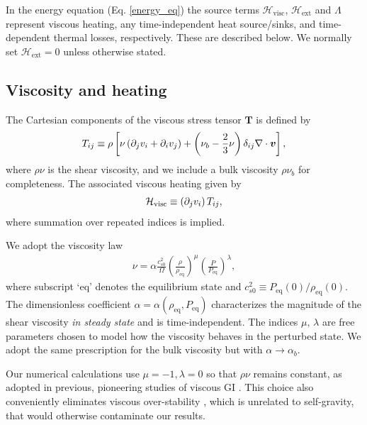 In the energy equation (Eq. \ref{energy_eq}) the source terms 
$\mathcal{H}_\mathrm{visc}$, $\mathcal{H}_\mathrm{ext}$ and $\Lambda$
represent viscous heating, any time-independent heat
source/sinks, and time-dependent thermal losses, respectively. These
are described below. We normally set
$\mathcal{H}_\mathrm{ext}=0$ unless otherwise stated. 

\subsection{Viscosity and heating}\label{visc_model}
The Cartesian components of the viscous stress tensor $\bm{T}$ is
defined by 
\begin{align}
  T_{ij} \equiv \rho \left[\nu \left(\partial_j v_i + \partial_i v_j\right) +
    \left(\nu_b-\frac{2}{3}\nu\right)\delta_{ij}\nabla\cdot\bm{v}\right], 
\end{align}
where $\rho\nu$ is the shear viscosity, and we include a bulk
viscosity $\rho\nu_b$ for completeness.  
The associated viscous heating given by
\begin{align}
  \mathcal{H}_\mathrm{visc} \equiv \left(\partial_jv_i\right)T_{ij}, 
\end{align}
where summation over repeated indices is implied. 

We adopt the viscosity law  
\begin{align}
  \nu = \alpha
  \frac{c_{s0}^2}{\Omega}\left(\frac{\rho}{\rho_\mathrm{eq}}\right)^\mu\left(\frac{P}{P_\mathrm{eq}}\right)^\lambda,            
\end{align}
where subscript `eq' denotes the equilibrium state and  
$c_{s0}^2\equiv P_\mathrm{eq}(0)/\rho_\mathrm{eq}(0)$. 
The dimensionless coefficient
$\alpha=\alpha(\rho_\mathrm{eq},P_\mathrm{eq})$ characterizes the
magnitude of the shear viscosity \emph{in steady state} 
and is time-independent. The indices $\mu,\,\lambda$ are free
parameters chosen to model how the viscosity behaves in the perturbed
state.  
We adopt the same prescription for the bulk viscosity but
with $\alpha\to\alpha_b$.   

Our numerical calculations use $\mu=-1,\lambda=0$ so 
that $\rho\nu$ remains constant, as adopted in previous, pioneering
studies of viscous GI 
\citep{lynden-bell74,hunter83,willerding92,gammie96}.  
This choice also conveniently eliminates viscous over-stability
\citep{schmit95,latter06}, which is unrelated to self-gravity, that
would otherwise contaminate our results.   

